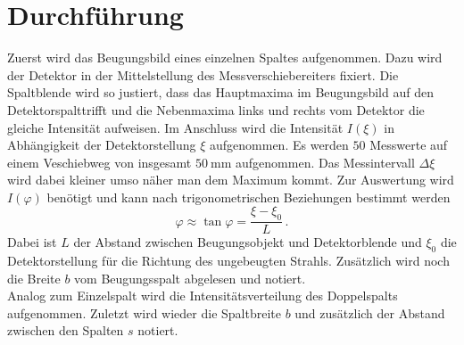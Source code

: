 \section{Durchführung}
\label{sec:Durchführung}
Zuerst wird das Beugungsbild eines einzelnen Spaltes aufgenommen.
Dazu wird der Detektor in der Mittelstellung des Messverschiebereiters fixiert.
Die Spaltblende wird so justiert, dass das Hauptmaxima im Beugungsbild auf den Detektorspalttrifft und die Nebenmaxima links und rechts vom Detektor die gleiche Intensität aufweisen.
Im Anschluss wird die Intensität $I(\xi)$ in Abhängigkeit der Detektorstellung $\xi$ aufgenommen.
Es werden $50$ Messwerte auf einem Veschiebweg von insgesamt $\SI{50}{\milli\metre}$ aufgenommen.
Das Messintervall $\Delta \xi$ wird dabei kleiner umso näher man dem Maximum kommt.
Zur Auswertung wird $I(\varphi)$ benötigt und kann nach trigonometrischen Beziehungen bestimmt werden
\begin{equation}
    \varphi \approx \tan \varphi = \frac{\xi - \xi_0}{L} \, .
\end{equation} 
Dabei ist $L$ der Abstand zwischen Beugungsobjekt und Detektorblende und $\xi_0$ die Detektorstellung für die Richtung des ungebeugten Strahls.
Zusätzlich wird noch die Breite $b$ vom Beugungsspalt abgelesen und notiert.
\\
Analog zum Einzelspalt wird die Intensitätsverteilung des Doppelspalts aufgenommen.
Zuletzt wird wieder die Spaltbreite $b$ und zusätzlich der Abstand zwischen den Spalten $s$ notiert.
